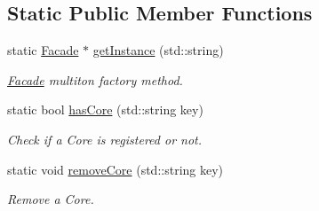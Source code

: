 \subsection*{Static Public Member Functions}
\begin{DoxyCompactItemize}
\item 
static \hyperlink{class_pure_m_v_c_1_1_facade}{Facade} $\ast$ \hyperlink{class_pure_m_v_c_1_1_facade_ae1c830f15ab4362829848514f5a16cca}{getInstance} (std::string)
\begin{DoxyCompactList}\small\item\em {\ttfamily \hyperlink{class_pure_m_v_c_1_1_facade}{Facade}} multiton factory method. \item\end{DoxyCompactList}\item 
static bool \hyperlink{class_pure_m_v_c_1_1_facade_a9e8587984b47e2b252365a95dbaeffde}{hasCore} (std::string key)
\begin{DoxyCompactList}\small\item\em Check if a Core is registered or not. \item\end{DoxyCompactList}\item 
static void \hyperlink{class_pure_m_v_c_1_1_facade_a78c803c55d417e9c8dd690f91543fc8c}{removeCore} (std::string key)
\begin{DoxyCompactList}\small\item\em Remove a Core. \item\end{DoxyCompactList}\end{DoxyCompactItemize}
